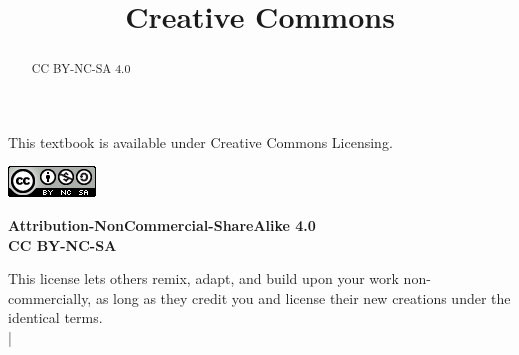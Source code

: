 \documentclass{ximera}
\title{Creative Commons}
\begin{document}
\begin{abstract}
  CC BY-NC-SA 4.0
\end{abstract}\maketitle




This textbook is available under Creative Commons Licensing.

\begin{center}
\begin{image}
\includegraphics{ccbyncsa.png}
\end{image}
\textbf{\textcolor{red!80!black}{Attribution-NonCommercial-ShareAlike 4.0\\CC BY-NC-SA}}
\end{center}


This license lets others remix, adapt, and build upon your work non-commercially, as long as they credit you and license their new creations under the identical terms. \\

 | 



 
\end{document}
